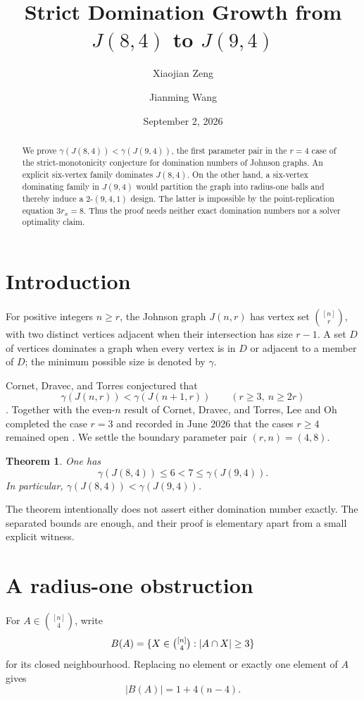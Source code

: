 \documentclass[11pt]{amsart}
\title{Strict Domination Growth from $J(8,4)$ to $J(9,4)$}
\author{Xiaojian Zeng}
\author{Jianming Wang}
\date{September 2, 2026}
\newtheorem{theorem}{Theorem}
\begin{document}
\begin{abstract}
We prove $\gamma(J(8,4))<\gamma(J(9,4))$, the first parameter pair in the
$r=4$ case of the strict-monotonicity conjecture for domination numbers of
Johnson graphs.  An explicit six-vertex family dominates $J(8,4)$.  On the
other hand, a six-vertex dominating family in $J(9,4)$ would partition the
graph into radius-one balls and thereby induce a $2$-$(9,4,1)$ design.  The
latter is impossible by the point-replication equation $3r_x=8$.  Thus the
proof needs neither exact domination numbers nor a solver optimality claim.
\end{abstract}
\maketitle

\section{Introduction}
For positive integers $n\ge r$, the Johnson graph $J(n,r)$ has vertex set
$\binom{[n]}r$, with two distinct vertices adjacent when their intersection
has size $r-1$.  A set $D$ of vertices dominates a graph when every vertex is
in $D$ or adjacent to a member of $D$; the minimum possible size is denoted by
$\gamma$.

Cornet, Dravec, and Torres conjectured that
\[
 \gamma(J(n,r))<\gamma(J(n+1,r))\qquad(r\ge3,\ n\ge2r)
\]
\cite[Conjecture~14]{CornetDravecTorres2025}.  Together with the even-$n$
result of Cornet, Dravec, and Torres, Lee and Oh completed the case $r=3$
and recorded in June 2026 that the cases $r\ge4$ remained open
\cite[Concluding remarks]{LeeOh2026}.  We settle the boundary parameter pair
$(r,n)=(4,8)$.

\begin{theorem}\label{thm:main}
One has
\[
 \gamma(J(8,4))\le6<7\le\gamma(J(9,4)).
\]
In particular, $\gamma(J(8,4))<\gamma(J(9,4))$.
\end{theorem}

The theorem intentionally does not assert either domination number exactly.
The separated bounds are enough, and their proof is elementary apart from a
small explicit witness.

\section{A radius-one obstruction}
For $A\in\binom{[n]}4$, write
\[
 B(A)=\{X\in\tbinom{[n]}4:|A\cap X|\ge3\}
\]
for its closed neighbourhood.  Replacing no element or exactly one element of
$A$ gives
\begin{equation}\label{eq:ballsize}
 |B(A)|=1+4(n-4).
\end{equation}
\end{document}

